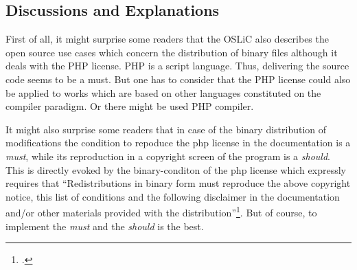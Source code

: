 \subsection{Discussions and Explanations}

\label{sec:PhpDiscussions}

First of all, it might surprise some readers that the OSLiC also describes the
open source use cases which concern the distribution of binary files although it
deals with the PHP license. PHP is a script language. Thus, delivering the
source code seems to be a must. But one has to consider that the PHP license
could also be applied to works which are based on other languages constituted on
the compiler paradigm. Or there might be used PHP compiler.

It might also surprise some readers that in case of the binary distribution of
modifications the condition to repoduce the php license in the documentation is
a \emph{must}, while its reproduction in a copyright screen of the program is a
\emph{should}. This is directly evoked by the binary-conditon of the php license
which expressly requires that \enquote{Redistributions in binary form must
reproduce the above copyright notice, this list of conditions and the following
disclaimer in the documentation and/or other materials provided with the
distribution}\footcite[cf.][wp. §2]{Php30OsiLicense2013a}. But of course, to
implement the \emph{must} and the \emph{should} is the best.

%
